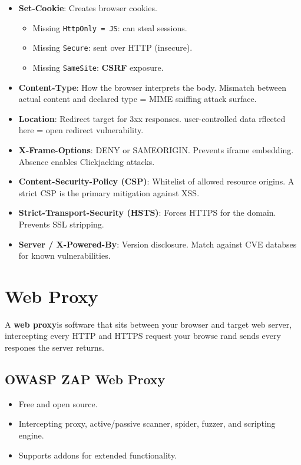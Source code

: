 \documentclass[12pt, letterpaper]{article}
\begin{document}
\begin{itemize}
    \item \textbf{Set-Cookie}: Creates browser cookies.
        \begin{itemize}
            \item Missing \texttt{HttpOnly = JS}: can steal sessions.
            \item Missing \texttt{Secure}: sent over HTTP (insecure).
            \item Missing \texttt{SameSite}: \textbf{CSRF} exposure.
        \end{itemize}
    \item \textbf{Content-Type}: How the browser interprets the body. Mismatch between actual content and declared type = MIME sniffing attack surface.
    \item \textbf{Location}: Redirect target for 3xx responses. user-controlled data rflected here = open redirect vulnerability.
    \item \textbf{X-Frame-Options}: DENY or SAMEORIGIN. Prevents iframe embedding. Absence enables Clickjacking attacks.
    \item \textbf{Content-Security-Policy (CSP)}: Whitelist of allowed resource origins. A strict CSP is the primary mitigation against XSS.
    \item \textbf{Strict-Transport-Security (HSTS)}: Forces HTTPS for the domain. Prevents SSL stripping.
    \item \textbf{Server / X-Powered-By}: Version disclosure. Match against CVE databses for known vulnerabilities.
\end{itemize}

\section*{Web Proxy}

A \textbf{web proxy}is software that sits between your browser and target web server, intercepting every HTTP and HTTPS request your browse rand sends every respones the server returns.

\subsection*{OWASP ZAP Web Proxy}

\begin{itemize}
    \item Free and open source.
    \item Intercepting proxy, active/passive scanner, spider, fuzzer, and scripting engine.
    \item Supports addons for extended functionality.
\end{itemize}
\end{document}
